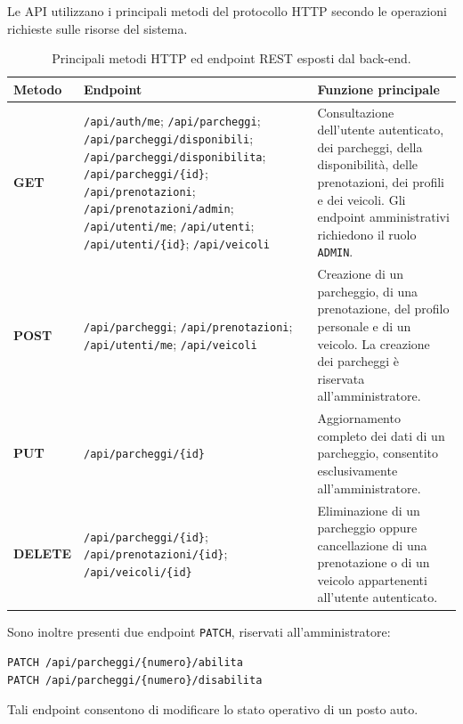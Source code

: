 \documentclass[11pt,a4paper]{article}
\begin{document}
Le API utilizzano i principali metodi del protocollo HTTP secondo le operazioni richieste sulle risorse del sistema.

\begin{table}[H]
\centering
\scriptsize
\begin{tabularx}{\textwidth}{
>{\raggedright\arraybackslash\bfseries}p{1.45cm}
>{\raggedright\arraybackslash}p{7.95cm}
Y}
\toprule
Metodo & Endpoint & Funzione principale \\
\midrule
GET &
\texttt{/api/auth/me};
\texttt{/api/parcheggi};
\texttt{/api/parcheggi/disponibili};
\texttt{/api/parcheggi/disponibilita};
\texttt{/api/parcheggi/\{id\}};
\texttt{/api/prenotazioni};
\texttt{/api/prenotazioni/admin};
\texttt{/api/utenti/me};
\texttt{/api/utenti};
\texttt{/api/utenti/\{id\}};
\texttt{/api/veicoli}
&
Consultazione dell'utente autenticato, dei parcheggi, della disponibilità, delle prenotazioni, dei profili e dei veicoli. Gli endpoint amministrativi richiedono il ruolo \texttt{ADMIN}. \\

POST &
\texttt{/api/parcheggi};
\texttt{/api/prenotazioni};
\texttt{/api/utenti/me};
\texttt{/api/veicoli}
&
Creazione di un parcheggio, di una prenotazione, del profilo personale e di un veicolo. La creazione dei parcheggi è riservata all'amministratore. \\

PUT &
\texttt{/api/parcheggi/\{id\}}
&
Aggiornamento completo dei dati di un parcheggio, consentito esclusivamente all'amministratore. \\

DELETE &
\texttt{/api/parcheggi/\{id\}};
\texttt{/api/prenotazioni/\{id\}};
\texttt{/api/veicoli/\{id\}}
&
Eliminazione di un parcheggio oppure cancellazione di una prenotazione o di un veicolo appartenenti all'utente autenticato. \\
\bottomrule
\end{tabularx}
\caption{Principali metodi HTTP ed endpoint REST esposti dal back-end.}
\end{table}

Sono inoltre presenti due endpoint \texttt{PATCH}, riservati all'amministratore:
\begin{center}
\footnotesize
\texttt{PATCH /api/parcheggi/\{numero\}/abilita}\\
\texttt{PATCH /api/parcheggi/\{numero\}/disabilita}
\end{center}
Tali endpoint consentono di modificare lo stato operativo di un posto auto.
\end{document}
